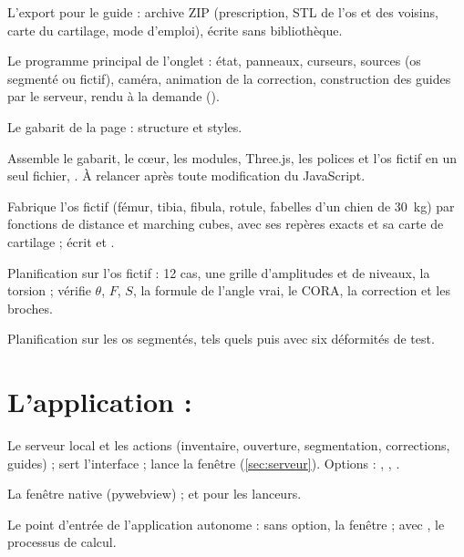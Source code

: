  L'export pour le guide : archive ZIP (prescription, STL de l'os et des
voisins, carte du cartilage, mode d'emploi), écrite sans bibliothèque.

 Le programme principal de l'onglet : état, panneaux, curseurs, sources (os
segmenté ou fictif), caméra, animation de la correction, construction des guides par le serveur, rendu à la demande
().

 Le gabarit de la page : structure et styles.

 Assemble le gabarit, le cœur, les modules, Three.js, les polices et l'os fictif en un
seul fichier, . À relancer après toute modification du JavaScript.

 Fabrique l'os fictif (fémur, tibia, fibula, rotule, fabelles d'un chien de
30~kg) par fonctions de distance et marching cubes, avec ses repères exacts et sa carte de cartilage ; écrit
 et .

 Planification sur l'os fictif : 12 cas, une grille d'amplitudes et de niveaux,
la torsion ; vérifie $\theta$, $F$, $S$, la formule de l'angle vrai, le CORA, la correction et les broches.

 Planification sur les os segmentés, tels quels puis avec six déformités de test.

\section{L'application : \texorpdfstring{}{application/}}

 Le serveur local et les actions (inventaire, ouverture, segmentation, corrections,
guides) ; sert l'interface ; lance la fenêtre (\cref{sec:serveur}). Options : , ,
.

 La fenêtre native (pywebview) ;  et  pour les
lanceurs.

 Le point d'entrée de l'application autonome : sans option, la fenêtre ; avec
, le processus de calcul.

